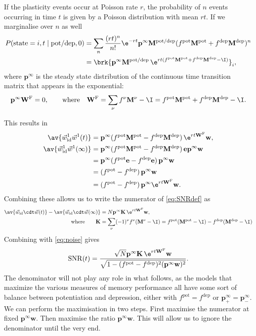 \documentclass[12pt]{article}
\newcommand{\onev}{\mathbf{e}}
\newcommand{\pr}{\mathbf{p}}
\newcommand{\eq}{\pr^\infty}
\newcommand{\w}{\mathbf{w}}
\newcommand{\W}{\mathbf{W}}
\newcommand{\M}{\mathbf{M}}
\newcommand{\enc}{\mathbf{K}}
\newcommand{\frg}{\W^{\mathrm{F}}}
\newcommand{\pot}{^{\text{pot}}}
\newcommand{\dep}{^{\text{dep}}}
\newcommand{\potdep}{^{\text{pot/dep}}}
\newcommand{\syn}{\vec{w}}
\newcommand{\synid}{\syn_\text{id}}
\DeclareMathOperator{\SNR}{SNR}
\begin{document}
If the plasticity events occur at Poisson rate $r$, the probability of $n$ events occurring in time $t$ is given by a Poisson distribution with mean $rt$.
If we marginalise over $n$ as well
%
\begin{equation}\label{eq:plastseqav}
\begin{aligned}
  P(\text{state}=i,t \mid \text{pot/dep},0)
    &= \sum_n \frac{(rt)^n}{n!} \e^{-rt} \eq \M\potdep (f\pot\M\pot+f\dep\M\dep)^n \\
    &= \brk{ \eq \M\potdep\, \e^{rt(f\pot\M\pot+f\dep\M\dep-\I) } }_i,
\end{aligned}
\end{equation}
%
where $\eq$ is the steady state distribution of the continuous time transition matrix that appears in the exponential:
%
\begin{equation}\label{eq:eq}
  \eq\frg = 0,
  \qquad\text{where}\quad
  \frg = \sum_\nu f^\nu \M^\nu - \I
    = f\pot\M\pot + f\dep\M\dep - \I.
\end{equation}
%



This results in
%
\begin{equation}\label{eq:overlapwt}
\begin{aligned}
  \av{\synid^1 \syn^1(t)} &= \eq (f\pot\M\pot-f\dep\M\dep)\, \e^{rt\frg} \w, \\
  \av{\synid^1 \syn^1(\infty)} &= \eq (f\pot\M\pot-f\dep\M\dep)\, \onev\eq \w \\
         &= \eq (f\pot\onev-f\dep\onev)\, \eq \w \\
         &=  (f\pot-f\dep)\, \eq \w \\
         &=  (f\pot-f\dep)\, \eq \e^{rt\frg} \w .
\end{aligned}
\end{equation}
%
Combining these allows us to write the numerator of \eqref{eq:SNRdef} as
%
\begin{equation}\label{eq:signal}
\begin{aligned}
  \av{\synid \cdt \syn(t)} - \av{\synid \cdt \syn(\infty)}
    &= N \eq \enc \, \e^{rt \frg} \w , \\
    \text{where} \qquad
  \enc &= \sum_\nu (-1)^\nu f^\nu (\M^\nu - \I)
    = f\pot(\M\pot-\I)-f\dep(\M\dep-\I)
\end{aligned}
\end{equation}
%
Combining with \eqref{eq:noise} gives
%
\begin{equation}\label{eq:SNRcurveExact}
  \SNR(t) = \frac{\sqrt{N} \eq \enc\,\e^{rt\frg}\w}
                 {\sqrt{1-(f\pot-f\dep)^2(\eq\w)^2}}.
\end{equation}
%
The denominator will not play any role in what follows, as the models that maximize the various measures of memory performance all have some sort of balance between potentiation and depression, either with $f\pot=f\dep$ or $\eq_+=\eq_-$.
We can perform the maximisation in two steps.
First maximise the numerator at fixed $\eq\w$.
Then maximise the ratio \wrt $\eq\w$.
This will allow us to ignore the denominator until the very end.
\end{document}
